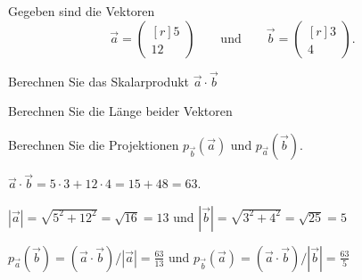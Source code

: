 Gegeben sind die Vektoren
\[
\vec{a}
=
\begin{pmatrix*}[r] 5 \\ 12\end{pmatrix*}
\qquad\text{und}\qquad
\vec{b}
=
\begin{pmatrix*}[r] 3 \\ 4 \end{pmatrix*}.
\]
\begin{teilaufgaben}
\item Berechnen Sie das Skalarprodukt $\vec{a}\cdot\vec{b}$
\item Berechnen Sie die Länge beider Vektoren
\item Berechnen Sie die Projektionen
$p_{\vec{b}}(\vec{a})$
und
$p_{\vec{a}}(\vec{b})$.
\end{teilaufgaben}

\begin{loesung}
\begin{teilaufgaben}
\item $\vec{a}\cdot\vec{b}=5\cdot 3 + 12\cdot 4 = 15+48=63$.
\item
$|\vec{a}| = \!\sqrt{5^2+12^2}=\!\sqrt{16}=13$
und
$|\vec{b}| = \!\sqrt{3^2+4^2}=\!\sqrt{25}=5$
\item
$p_{\vec{a}}(\vec{b}) = (\vec{a}\cdot\vec{b})/|\vec{a}| = \frac{63}{13}$
und
$p_{\vec{b}}(\vec{a}) = (\vec{a}\cdot\vec{b})/|\vec{b}| = \frac{63}{5}$
\qedhere
\end{teilaufgaben}
\end{loesung}
